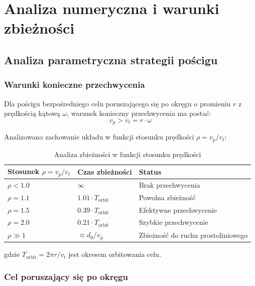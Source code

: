 \documentclass[12pt,a4paper]{article}
\begin{document}
\section{Analiza numeryczna i warunki zbieżności}


\subsection{Analiza parametryczna strategii pościgu}

\subsubsection{Warunki konieczne przechwycenia}

Dla pościgu bezpośredniego celu poruszającego się po okręgu o promieniu $r$ z prędkością kątową $\omega$, warunek konieczny przechwycenia ma postać:
\begin{equation}
v_p > v_t = r \cdot \omega
\label{eq:capture_condition}
\end{equation}

Analizowano zachowanie układu w funkcji stosunku prędkości $\rho = v_p/v_t$:

\begin{table}[H]
\centering
\caption{Analiza zbieżności w funkcji stosunku prędkości}
\label{tab:velocity_ratio_analysis}
\begin{tabular}{@{}lll@{}}
\toprule
\textbf{Stosunek $\rho = v_p/v_t$} & \textbf{Czas zbieżności} & \textbf{Status} \\ \midrule
$\rho < 1.0$ & $\infty$ & Brak przechwycenia \\
$\rho = 1.1$ & $1.01 \cdot T_{\text{orbit}}$ & Powolna zbieżność \\
$\rho = 1.5$ & $0.39 \cdot T_{\text{orbit}}$ & Efektywne przechwycenie \\
$\rho = 2.0$ & $0.21 \cdot T_{\text{orbit}}$ & Szybkie przechwycenie \\
$\rho \gg 1$ & $\approx d_0/v_p$ & Zbieżność do ruchu prostoliniowego \\ \bottomrule
\end{tabular}
\end{table}

gdzie $T_{\text{orbit}} = 2\pi r/v_t$ jest okresem orbitowania celu.

\subsubsection{Cel poruszający się po okręgu}
\end{document}
